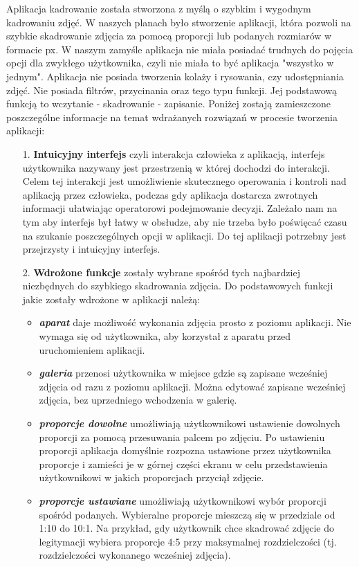 Aplikacja kadrowanie została stworzona z myślą o szybkim i wygodnym kadrowaniu zdjęć. W naszych planach było stworzenie aplikacji, która pozwoli na szybkie skadrowanie zdjęcia za pomocą proporcji lub podanych rozmiarów w formacie px. W naszym zamyśle aplikacja nie miała posiadać trudnych do pojęcia opcji dla zwykłego użytkownika, czyli nie miała to być aplikacja "wszystko w jednym". Aplikacja nie posiada  tworzenia kolaży i rysowania, czy udostępniania zdjęć. Nie posiada filtrów, przycinania oraz tego typu funkcji. Jej podstawową funkcją to wczytanie - skadrowanie - zapisanie. Poniżej zostają zamieszczone poszczególne informacje na temat wdrażanych rozwiązań w procesie tworzenia aplikacji:
\begin{itemize}
\item [1.] \textbf{Intuicyjny interfejs} czyli interakcja człowieka z aplikacją, interfejs użytkownika nazywany jest przestrzenią w której dochodzi do interakcji. Celem tej interakcji jest umożliwienie skutecznego operowania i kontroli nad aplikacją przez człowieka, podczas gdy aplikacja dostarcza zwrotnych informacji ułatwiając operatorowi podejmowanie decyzji. Zależało nam na tym aby interfejs był łatwy w obsłudze, aby nie trzeba było poświęcać czasu na szukanie poszczególnych opcji w aplikacji. Do tej aplikacji potrzebny jest przejrzysty i intuicyjny interfejs.
\newpage
\item [2.] \textbf{Wdrożone funkcje} zostały wybrane spośród tych najbardziej niezbędnych do szybkiego skadrowania zdjęcia. Do podstawowych funkcji jakie zostały wdrożone w aplikacji należą:
\begin{itemize}
\item \textit{\textbf{aparat}} daje możliwość wykonania zdjęcia prosto z poziomu aplikacji. Nie wymaga się od użytkownika, aby korzystał z aparatu przed uruchomieniem aplikacji.
\item \textit{\textbf{galeria}} przenosi użytkownika w miejsce gdzie są zapisane wcześniej zdjęcia od razu z poziomu aplikacji. Można edytować zapisane wcześniej zdjęcia, bez uprzedniego wchodzenia w galerię.
\item \textit{\textbf{proporcje dowolne}} umożliwiają użytkownikowi ustawienie dowolnych proporcji za pomocą przesuwania palcem po zdjęciu. Po ustawieniu proporcji aplikacja domyślnie rozpozna ustawione przez użytkownika proporcje i zamieści je w górnej części ekranu w celu przedstawienia użytkownikowi w jakich proporcjach przyciął zdjęcie. 
\item \textit{\textbf{proporcje ustawiane}} umożliwiają użytkownikowi wybór proporcji spośród podanych. Wybieralne proporcje mieszczą się w przedziale od 1:10 do 10:1. Na przykład, gdy użytkownik chce skadrować zdjęcie do legitymacji wybiera proporcje 4:5 przy maksymalnej rozdzielczości (tj. rozdzielczości wykonanego wcześniej zdjęcia).

\end{itemize}
\end{itemize}
